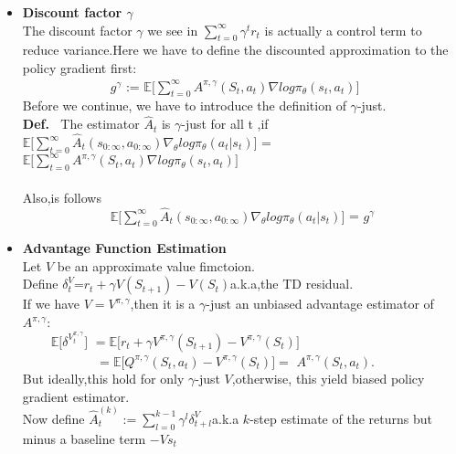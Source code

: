 \begin{itemize}
    \item \large{\bf Discount factor $\gamma$}\\
    The discount factor $\gamma$ we see in $\sum_{t=0}^{\infty}{\gamma}^{t}r_{t}$ is actually a control term to reduce variance.Here we have to define the discounted approximation to the policy gradient first:\\
    \large$~~~~~~~~~~~~~~~~~~~~~~~~~~~~~~~g^{\gamma}$ := $\mathbb{E}{\Bigg[{\sum_{t=0}^{\infty}{A^{\pi,\gamma}(S_t,a_t){\nabla}log{\pi_{\theta}(s_t,a_t)}}}\Bigg]}$\\
    Before we continue, we have to introduce the definition of ${\gamma}$-just.\\
    {\bf Def.}$~~~~$The estimator $\hat{A}_t$ is ${\gamma}$-just for all t ,if\\
    $\mathbb{E}{\Bigg[{\sum_{t=0}^{\infty}{\hat{A}_t(s_{0:\infty},a_{0:\infty}){\nabla}_{\theta}log{\pi}_{\theta}(a_t|s_t)}}\Bigg]}$ = $\mathbb{E}{\Bigg[{\sum_{t=0}^{\infty}{A^{\pi,\gamma}(S_t,a_t){\nabla}log{\pi_{\theta}(s_t,a_t)}}}\Bigg]}$\\
    \\
    Also,is follows\\
    $~~~~~~~~~~~~~~~~~~~~~~~~~~~~~~~\mathbb{E}{\Bigg[{\sum_{t=0}^{\infty}{\hat{A}_t(s_{0:\infty},a_{0:\infty}){\nabla}_{\theta}log{\pi}_{\theta}(a_t|s_t)}}\Bigg]}$ = $g^{\gamma}$\\
    \item \large{\bf Advantage Function Estimation}\\
    Let $V$ be an approximate value fimctoion.\\
    Define $\delta^{V}_{t}$=${r_t + {\gamma}V(S_{t+1})-V(S_t)}$a.k.a,the TD residual.\\
    If we have $V = V^{\pi,\gamma}$,then it is a ${\gamma}$-just an unbiased advantage estimator of ${A^{\pi,\gamma}}$:\\
    $~~~~~~~~~~{\mathbb{E}\Bigg[{\delta^{V^{\pi,\gamma}_t}}\Bigg]}$ $={\mathbb{E}\Bigg[{r_t + {\gamma}V^{\pi,\gamma}(S_{t+1})-V^{\pi,\gamma}(S_t)}\Bigg]}$\\
    $~~~~~~~~~~~~~~~~~~~~~~~~~~={\mathbb{E}\Bigg[{Q^{\pi,\gamma}(S_t,a_t)}-V^{\pi,\gamma}(S_t)\Bigg]}=$
    $A^{\pi,\gamma}(S_t,a_t).$\\
    But ideally,this hold for only ${\gamma}$-just ${V}$,otherwise, this yield biased policy gradient estimator.\\
    Now define $\hat{A}^{(k)}_{t} :={\sum_{l=0}^{k-1}{\gamma}^{l}{\delta}^{V}_{t+l}}$a.k.a $k$-step estimate of the returns but minus a baseline term $-V{s_t}$\\

\end{itemize}

